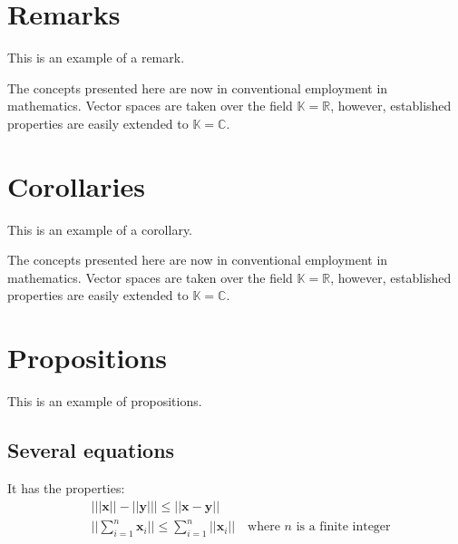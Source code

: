 \documentclass[11pt,fleqn]{book} %
\begin{document}
\section{Remarks}

This is an example of a remark.

\begin{remark}
The concepts presented here are now in conventional employment in mathematics. Vector spaces are taken over the field $\mathbb{K}=\mathbb{R}$, however, established properties are easily extended to $\mathbb{K}=\mathbb{C}$.
\end{remark}


\section{Corollaries}

This is an example of a corollary.

\begin{corollary}
The concepts presented here are now in conventional employment in mathematics. Vector spaces are taken over the field $\mathbb{K}=\mathbb{R}$, however, established properties are easily extended to $\mathbb{K}=\mathbb{C}$.
\end{corollary}


\section{Propositions}

This is an example of propositions.

\subsection{Several equations}

\begin{proposition}
It has the properties:
\begin{align}
& \big| ||\mathbf{x}|| - ||\mathbf{y}|| \big|\leq || \mathbf{x}- \mathbf{y}||\\
&  ||\sum_{i=1}^n\mathbf{x}_i||\leq \sum_{i=1}^n||\mathbf{x}_i||\quad\text{where $n$ is a finite integer}
\end{align}
\end{proposition}
\end{document}
